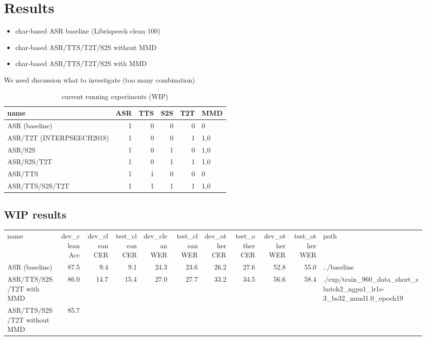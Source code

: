 \documentclass{ltjsarticle}
\begin{document}
\section*{Results}
\label{sec:orgf9b8afa}

\begin{itemize}
\item char-based ASR baseline (Librispeech clean 100)

\item char-based ASR/TTS/T2T/S2S without MMD

\item char-based ASR/TTS/T2T/S2S with MMD
\end{itemize}


We need discussion what to investigate (too many combination)

\begin{table}[htbp]
\caption{\label{tab:orgc45a865}
current running experiments (WIP)}
\centering
\begin{tabular}{lrrrrl}
name & ASR & TTS & S2S & T2T & MMD\\
\hline
ASR (baseline) & 1 & 0 & 0 & 0 & 0\\
ASR/T2T (INTERPSEECH2018) & 1 & 0 & 0 & 1 & 1,0\\
ASR/S2S & 1 & 0 & 1 & 0 & 1,0\\
ASR/S2S/T2T & 1 & 0 & 1 & 1 & 1,0\\
ASR/TTS & 1 & 1 & 0 & 0 & 0\\
ASR/TTS/S2S/T2T & 1 & 1 & 1 & 1 & 1,0\\
\end{tabular}
\end{table}

\subsection*{WIP results}
\label{sec:org29879a2}

\begin{center}
\begin{tabular}{lrrrrrrrrrl}
name & dev\_clean Acc & dev\_clean CER & test\_clean CER & dev\_clean WER & test\_clean WER & dev\_other CER & test\_other CER & dev\_other WER & test\_other WER & path\\
ASR (baseline) & 87.5 & 9.4 & 9.1 & 24.3 & 23.6 & 26.2 & 27.6 & 52.8 & 55.0 & ../baseline\\
ASR/TTS/S2S/T2T with MMD & 86.0 & 14.7 & 15.4 & 27.0 & 27.7 & 33.2 & 34.5 & 56.6 & 58.4 & ./exp/train\_960\_data\_short\_sbatch2\_ngpu1\_lr1e-3\_bs32\_mmd1.0\_epoch19\\
ASR/TTS/S2S/T2T without MMD & 85.7 &  &  &  &  &  &  &  &  & \\
\end{tabular}
\end{center}
\end{document}

